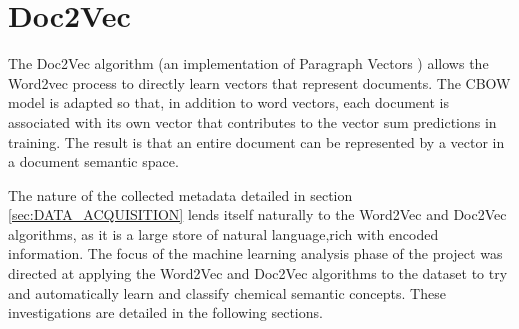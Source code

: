 \section{Doc2Vec}
The Doc2Vec algorithm \cite{gensim}(an implementation of Paragraph Vectors \cite{doc2vec}) allows the Word2vec process to directly learn vectors that represent documents. The CBOW model is adapted so that, in addition to word vectors, each document is associated with its own vector that contributes to the vector sum predictions in training. The result is that an entire document can be represented by a vector in a document semantic space.

The nature of the collected metadata detailed in section \ref{sec:DATA_ACQUISITION} lends itself naturally to the Word2Vec and Doc2Vec algorithms, as it is a large store of natural language,rich with encoded information. The focus of the machine learning analysis phase of the project was directed at applying the Word2Vec and Doc2Vec algorithms to the dataset to try and automatically learn and classify chemical semantic concepts. These investigations are detailed in the following sections.